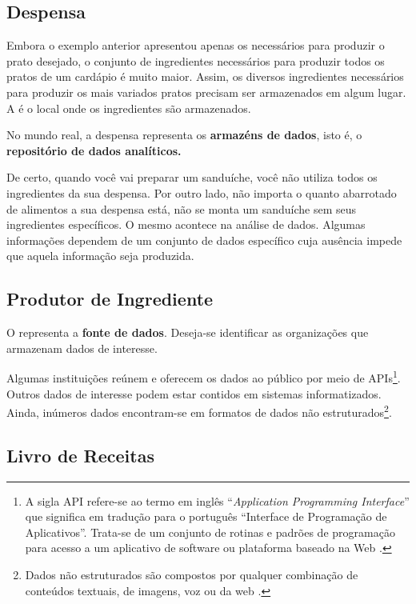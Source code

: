     \subsection*{Despensa}
    \label{sub-despensa}

    Embora o exemplo anterior apresentou apenas os \INGREDIENTES \xspace necessários para produzir o prato desejado, o conjunto de ingredientes necessários para produzir todos os pratos de um cardápio é muito maior. Assim, os diversos ingredientes necessários para produzir os mais variados pratos precisam ser armazenados em algum lugar. A \DESPENSA \xspace é o local onde os ingredientes são armazenados.
    
    No mundo real, a despensa representa os \textbf{armazéns de dados}, isto é, o \textbf{repositório de dados analíticos.}
    
    De certo, quando você vai preparar um sanduíche, você não utiliza todos os ingredientes da sua despensa. Por outro lado, não importa o quanto abarrotado de alimentos a sua despensa está, não se monta um sanduíche sem seus ingredientes específicos. O mesmo acontece na análise de dados. Algumas informações dependem de um conjunto de dados específico cuja ausência impede que aquela informação seja produzida.
    
    \subsection*{Produtor de Ingrediente}    
    O \PRODUTOR \xspace representa a \textbf{fonte de dados}. Deseja-se  identificar as organizações que armazenam dados de interesse. 
    
    Algumas instituições reúnem e oferecem os dados ao público por meio de APIs\footnote{A sigla API refere-se ao termo em inglês ``\emph{Application Programming Interface}'' que significa em tradução para o português ``Interface de Programação de Aplicativos''. Trata-se de um conjunto de rotinas e padrões de programação para acesso a um aplicativo de software ou plataforma baseado na Web \cite{wikipedia:api}.}. Outros dados de interesse podem estar contidos em sistemas informatizados. Ainda, inúmeros dados encontram-se em formatos de dados não estruturados\footnote{Dados não estruturados são compostos por qualquer combinação de conteúdos textuais, de imagens, voz ou da web \cite[70]{turban2019}.}.
    
    \subsection*{Livro de Receitas}
    \label{sub-livrodereceitas}
    

